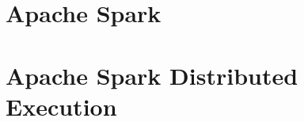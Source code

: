 \section{Apache Spark}\label{sec:apache-spark}


\section{Apache Spark Distributed Execution}\label{sec:apache-spark-distributed-execution}


%
